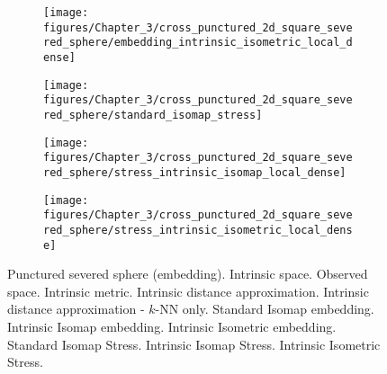 \begin{figure}[h]
\begin{centering}
\begin{subfigure}[b]{0.32\linewidth}
				\caption{\label{fig:punctured_severed_sphere_intrinsic_isomap_embedding}}
			\end{subfigure} \hfill
			\begin{subfigure}[b]{0.32\linewidth}
				\texttt{[image: figures/Chapter\_3/cross\_punctured\_2d\_square\_severed\_sphere/embedding\_intrinsic\_isometric\_local\_dense]}
				\caption{\label{fig:punctured_severed_sphere_intrinsic_isometric_embedding}}
			\end{subfigure}
		\end{centering}
		\begin{centering}
			\begin{subfigure}[b]{0.32\linewidth}
				\texttt{[image: figures/Chapter\_3/cross\_punctured\_2d\_square\_severed\_sphere/standard\_isomap\_stress]}
				\caption{\label{fig:punctured_severed_sphere_standard_isomap_stress}}
			\end{subfigure}
			\hfill
			\begin{subfigure}[b]{0.32\linewidth}
				\texttt{[image: figures/Chapter\_3/cross\_punctured\_2d\_square\_severed\_sphere/stress\_intrinsic\_isomap\_local\_dense]}
				\caption{\label{fig:punctured_severed_sphere_intrinsic_isomap_stress}}
			\end{subfigure}
			\hfill
			\begin{subfigure}[b]{0.32\linewidth}
				\texttt{[image: figures/Chapter\_3/cross\_punctured\_2d\_square\_severed\_sphere/stress\_intrinsic\_isometric\_local\_dense]}
				\caption{\label{fig:punctured_severed_sphere_intrinsic_isometric_stress}}
			\end{subfigure}
		\end{centering}
		\caption{\label{fig:punctured_severed_sphere} Punctured severed sphere (embedding). \protect{} Intrinsic space. 
		\protect{} Observed space. 
		\protect{} Intrinsic metric. 
		\protect{} Intrinsic distance approximation.
		\protect{} Intrinsic distance approximation - $k$-NN only.
		\protect{} Standard Isomap embedding.
		\protect{} Intrinsic Isomap embedding.
		\protect{} Intrinsic Isometric embedding.
		\protect{} Standard Isomap Stress.
		\protect{} Intrinsic Isomap Stress.
		\protect{} Intrinsic Isometric Stress.
		}
	\end{figure}

